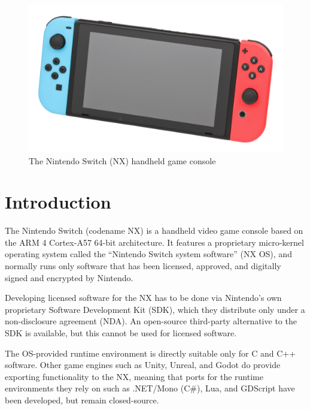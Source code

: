 \documentclass[format=sigconf]{acmart}
\begin{document}

\maketitle

\def\abovecaptionskip{1pt}
\def\listingautorefname{Listing}
\def\figureautorefname{Figure}

\begin{figure}[h]
  \centering
  \includegraphics[width=\linewidth]{switch.jpg}
  \caption{The Nintendo Switch (NX) handheld game console}
\end{figure}

\section{Introduction}\label{introduction}
The Nintendo Switch (codename NX) is a handheld video game console based on the ARM 4 Cortex-A57 64-bit architecture\cite{morgan2020}. It features a proprietary micro-kernel operating system called the ``Nintendo Switch system software''\cite{roussel2019methodically} (NX OS), and normally runs only software that has been licensed, approved, and digitally signed and encrypted by Nintendo.

Developing licensed software for the NX has to be done via Nintendo's own proprietary Software Development Kit (SDK), which they distribute only under a non-disclosure agreement (NDA). An open-source third-party alternative to the SDK is available\cite{switchbrew}, but this cannot be used for licensed software.

The OS-provided runtime environment is directly suitable only for C and C++ software. Other game engines such as Unity, Unreal, and Godot do provide exporting functionality to the NX, meaning that ports for the runtime environments they rely on such as .NET/Mono (C#), Lua, and GDScript have been developed, but remain closed-source.
\end{document}
